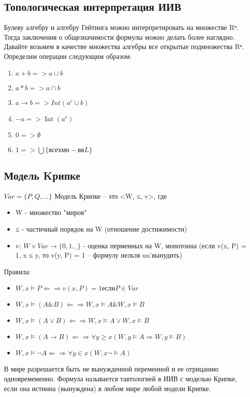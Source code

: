 \documentclass[12pt]{article}
\DeclareMathOperator{\Int}{Int}
\begin{document}
\subsection{Топологическая интерпретация ИИВ}
\label{sec-2-10}
Булеву алгебру и алгебру Гейтинга можно интерпретировать
на множестве Rⁿ. Тогда заключения о общезначимости формулы
можно делать более наглядно.
Давайте возьмем в качестве множества алгебры все открытые
подмножества Rⁿ. Определим операции следующим образом:
\begin{enumerate}
\item $a + b => a ∪ b$
\item $a * b => a ∩ b$
\item $a \to b => Int(a^c ∪ b)$
\item $-a => \Int(a^c)$
\item $0 => ∅$
\item $1 => ⋃\{всех мн-в в L\}$
\end{enumerate}
\subsection{Модель Kрипке}
\label{sec-2-11}
$Var = \{P, Q, \dotsc\}$
Модель Крипке – это <W, ≤, v>, где
\begin{itemize}
\item W - множество "миров"
\item ≤ - частичный порядок на W (отношение достижимости)
\item v: $W × Var \to \{0, 1, \_\}$ - оценка перменных на W, монотонна
(если v(x, P) = 1, x ≤ y, то v(y, P) = 1 – формулу нельзя un'вынудить)
\end{itemize}

Правила:
\begin{itemize}
\item $W, x \models  P ⇐⇒ v(x, P) = 1 если P \in Var$
\item $W, x \models  (A \& B) ⇐⇒ W, x \models  A \& W, x \models  B$
\item $W, x \models  (A \lor B) ⇐⇒ W, x \models  A \lor W, x \models  B$
\item $W, x \models  (A \to B) ⇐⇒ ∀ y ≥ x (W, y \models  A ⇒ W, y \models  B)$
\item $W, x \models  \lnot A ⇐⇒ ∀ y \in x (W, x \lnot \models  A)$
\end{itemize}

В мире разрешается быть не вынужденной переменной и ее отрицанию
одновремеменно.
Формула называется тавтологией в ИИВ с моделью Крипке, если она
истинна (вынуждена) в любом мире любой модели Крипке.
\end{document}
